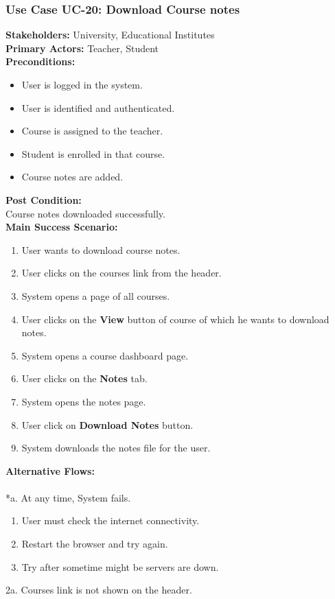 \documentclass[12pt]{article}
\begin{document}
\subsubsection{Use Case UC-20: Download Course notes}
\textbf{Stakeholders: } University, Educational Institutes \\
\textbf{Primary Actors: }Teacher, Student \\
\textbf{Preconditions:}
\begin{itemize}
\item User is logged in the system.
\item User is identified and authenticated.
\item Course is assigned to the teacher.
\item Student is enrolled in that course.
\item Course notes are added.
\end{itemize}
\textbf{Post Condition: }\\
Course notes downloaded successfully.\\
\textbf{Main Success Scenario:}
\begin{enumerate}
\item User wants to download course notes.
\item User clicks on the courses link from the header.
\item System opens a page of all courses.
\item User clicks on the \textbf{View} button of course of which he wants to download notes.
\item System opens a course dashboard page.
\item User clicks on the \textbf{Notes} tab.
\item System opens the notes page.
\item User click on \textbf{Download Notes} button.
\item System downloads the notes file for the user.
\end{enumerate}
\textbf{Alternative Flows:}\\
\\
*a. At any time, System fails.
\begin{enumerate}
\item User must check the internet connectivity.
\item Restart the browser and try again.
\item Try after sometime might be servers are down.
\end{enumerate}
2a. Courses link is not shown on the header.
\end{document}
